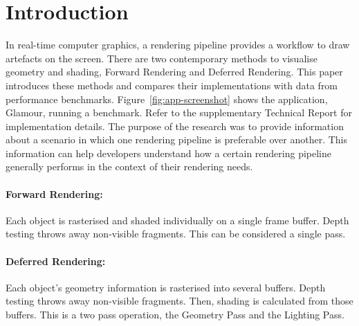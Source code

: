 \documentclass[11pt]{article}
\begin{document}
\newpage


\tableofcontents
\newpage
{}


\section{Introduction}

In real-time computer graphics, a rendering pipeline provides a workflow to draw artefacts on the screen.
There are two contemporary methods to visualise geometry and shading, Forward Rendering and Deferred Rendering.
This paper introduces these methods and compares their implementations with data from performance benchmarks.
Figure~\ref{fig:app-screenshot} shows the application, Glamour, running a benchmark.
Refer to the supplementary Technical Report\autocite{holland_technical_2020} for implementation details.
The purpose of the research was to provide information about a scenario in which one rendering pipeline is preferable over another.
This information can help developers understand how a certain rendering pipeline generally performs in the context of their rendering needs.

\paragraph{Forward Rendering:}
Each object is rasterised and shaded individually on a single frame buffer.
Depth testing throws away non-visible fragments.
This can be considered a single pass.

\paragraph{Deferred Rendering:}
Each object's geometry information is rasterised into several buffers.
Depth testing throws away non-visible fragments.
Then, shading is calculated from those buffers.
This is a two pass operation, the Geometry Pass and the Lighting Pass.
\end{document}
